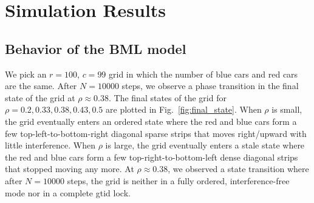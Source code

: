 \documentclass[twocolumn]{article}
\begin{document}
\section{Simulation Results}
\subsection{Behavior of the BML model}
We pick an $r=100$, $c=99$ grid in which the number of blue cars and red cars
are the same. After $N = 10000$ steps, we observe a phase transition in the
final state of the grid at $\rho\approx 0.38$. The final states of the grid for
$\rho = 0.2, 0.33, 0.38, 0.43, 0.5$ are plotted in Fig.~\ref{fig:final_state}.
When $\rho$ is small, the grid eventually enters an ordered state where the red
and blue cars form a few top-left-to-bottom-right diagonal sparse strips that
moves right/upward with little interference. When $\rho$ is large, the grid eventually
enters a stale state where the red and blue cars form a few
top-right-to-bottom-left dense diagonal strips that stopped moving any more. At
$\rho\approx 0.38$, we observed a state transition where after $N = 10000$
steps, the grid is neither in a fully ordered, interference-free mode nor in a
complete gtid lock.
\end{document}
